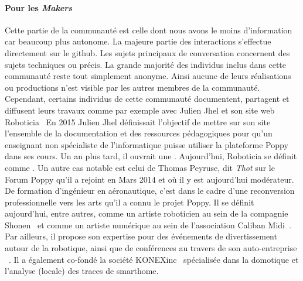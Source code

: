         \paragraph{Pour les \textit{Makers}}\label{sec:makers}
            Cette partie de la communauté est celle dont nous avons le moins d'information car beaucoup plus autonome. La majeure partie des interactions s'effectue directement sur le github. Les sujets principaux de conversation concernent des sujets techniques ou précis.
            La grande majorité des individus inclus dans cette communauté reste tout simplement anonyme. Ainsi aucune de leurs réalisations ou productions n'est visible par les autres membres de la communauté.
            Cependant, certains individus de cette communauté documentent, partagent et diffusent leurs travaux comme par exemple avec Julien Jhel et son site web Roboticia~
                En 2015 Julien Jhel définissait l'objectif de mettre sur son site l’ensemble de la documentation et des ressources pédagogiques pour qu’un enseignant non spécialiste de l’informatique puisse utiliser la plateforme Poppy dans ses cours. Un an plus tard, il ouvrait une . Aujourd'hui, Roboticia se définit comme .%
                Un autre cas notable est celui de Thomas Peyruse, dit \textit{Thot} sur le Forum Poppy qu'il a rejoint en Mars 2014 et où il y est aujourd'hui modérateur. De formation d'ingénieur en aéronautique, c'est dans le cadre d'une reconversion professionnelle vers les arts qu'il a connu le projet Poppy. Il se définit aujourd'hui, entre autres, comme un artiste roboticien au sein de la compagnie Shonen~ et comme un artiste numérique au sein de l'association Caliban Midi~. Par ailleurs, il propose son expertise pour des événements de divertissement autour de la robotique, ainsi que de conférences au travers de son auto-entreprise ~. Il a également co-fondé la société KONEXinc~ spécialisée dans la domotique et l'analyse (locale) des traces de smarthome.
